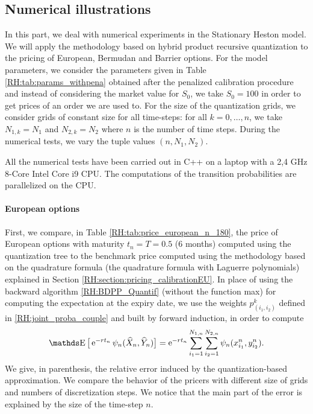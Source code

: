 \subsection{Numerical illustrations}

In this part, we deal with numerical experiments in the Stationary Heston model. We will apply the methodology based on hybrid product recursive quantization to the pricing of European, Bermudan and Barrier options. For the model parameters, we consider the parameters given in Table \ref{RH:tab:params_withpena} obtained after the penalized calibration procedure and instead of considering the market value for $S_0$, we take $S_0=100$ in order to get prices of an order we are used to. For the size of the quantization grids, we consider grids of constant size for all time-steps: for all $k=0, \dots, n$, we take $N_{1,k} = N_1$ and $N_{2,k} = N_2$ where $n$ is the number of time steps. During the numerical tests, we vary the tuple values $(n,N_1,N_2)$.

All the numerical tests have been carried out in C++ on a laptop with a 2,4 GHz 8-Core Intel Core i9 CPU. The computations of the transition probabilities are parallelized on the CPU.


\paragraph{European options}
First, we compare, in Table \ref{RH:tab:price_european_n_180}, the price of European options with maturity $t_n = T=0.5$ ($6$ months) computed using the quantization tree to the benchmark price computed using the methodology based on the quadrature formula (the quadrature formula with Laguerre polynomials) explained in Section \ref{RH:section:pricing_calibrationEU}. In place of using the backward algorithm \eqref{RH:BDPP_Quantif} (without the function max) for computing the expectation at the expiry date, we use the weights $p_{(i_1,i_2)}^k$ defined in \eqref{RH:joint_proba_couple} and built by forward induction, in order to compute
\begin{equation}
	\E \big[ \e^{-r t_n} \psi_n ( \widehat X_n, \widehat Y_n ) \big] = \e^{-r t_n} \sum_{i_1=1}^{N_{1,n}} \sum_{i_2=1}^{N_{2,n}} \psi_n ( x_{i_1}^n, y_{i_2}^n ).
\end{equation}
We give, in parenthesis, the relative error induced by the quantization-based approximation. We compare the behavior of the pricers with different size of grids and numbers of discretization steps. We notice that the main part of the error is explained by the size of the time-step $n$.

